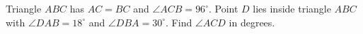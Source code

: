 Triangle $ABC$ has $AC=BC$ and $\angle ACB=96^\circ$. Point $D$ lies inside triangle $ABC$ with $\angle DAB=18^\circ$ and $\angle DBA=30^\circ$. Find $\angle ACD$ in degrees.
